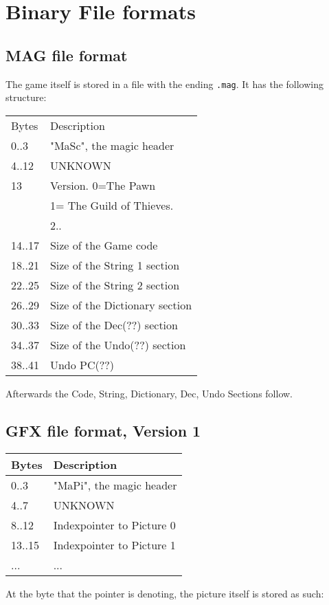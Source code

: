 \documentclass[11pt,twoside,openright]{report}
\begin{document}
\chapter{Binary File formats}
\section{MAG file format}
The game itself is stored in a file with the ending {\tt .mag}. It has the following structure:

\begin{tabular}{l|l}
Bytes&Description\\
0..3&"MaSc", the magic header\\
4..12&UNKNOWN\\
13&Version. 0=The Pawn\\
&1= The Guild of Thieves.\\
&2..\\
14..17&Size of the Game code\\
18..21&Size of the String 1 section\\
22..25&Size of the String 2 section\\
26..29&Size of the Dictionary section\\
30..33&Size of the Dec(??) section\\
34..37&Size of the Undo(??) section\\
38..41&Undo PC(??)\\\hline
\end{tabular}

Afterwards the Code, String, Dictionary, Dec, Undo Sections follow.
\section{GFX file format, Version 1}
\begin{tabular}{l|l}
Bytes&Description\\\hline
0..3&"MaPi", the magic header\\
4..7&UNKNOWN\\
8..12&Indexpointer to Picture 0\\
13..15&Indexpointer to Picture 1\\
...&...\\
\end{tabular}

At the byte that the pointer is denoting, the picture itself is stored as such:
\end{document}
